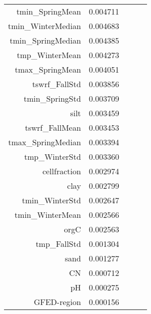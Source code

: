 \begin{tabular}{rrrrr}
tmin_SpringMean & 0.004711 \\
tmin_WinterMedian & 0.004683 \\
tmin_SpringMedian & 0.004385 \\
tmp_WinterMean & 0.004273 \\
tmax_SpringMean & 0.004051 \\
tswrf_FallStd & 0.003856 \\
tmin_SpringStd & 0.003709 \\
silt & 0.003459 \\
tswrf_FallMean & 0.003453 \\
tmax_SpringMedian & 0.003394 \\
tmp_WinterStd & 0.003360 \\
cellfraction & 0.002974 \\
clay & 0.002799 \\
tmin_WinterStd & 0.002647 \\
tmin_WinterMean & 0.002566 \\
orgC & 0.002563 \\
tmp_FallStd & 0.001304 \\
sand & 0.001277 \\
CN & 0.000712 \\
pH & 0.000275 \\
GFED-region & 0.000156 \\
\bottomrule
\end{tabular}
